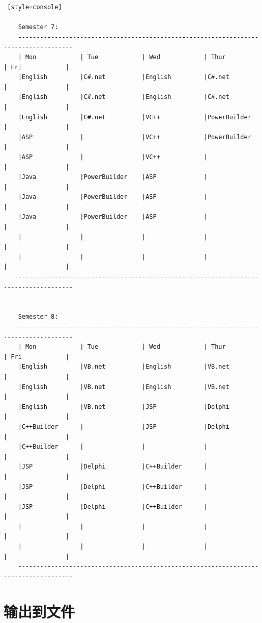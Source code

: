 \begin{lstlisting} [style=console]
    
    Semester 7: 
    -------------------------------------------------------------------------------------
    | Mon            | Tue            | Wed            | Thur           | Fri            |
    |English         |C#.net          |English         |C#.net          |                |
    |English         |C#.net          |English         |C#.net          |                |
    |English         |C#.net          |VC++            |PowerBuilder    |                |
    |ASP             |                |VC++            |PowerBuilder    |                |
    |ASP             |                |VC++            |                |                |
    |Java            |PowerBuilder    |ASP             |                |                |
    |Java            |PowerBuilder    |ASP             |                |                |
    |Java            |PowerBuilder    |ASP             |                |                |
    |                |                |                |                |                |
    |                |                |                |                |                |
    -------------------------------------------------------------------------------------
    
    
    Semester 8: 
    -------------------------------------------------------------------------------------
    | Mon            | Tue            | Wed            | Thur           | Fri            |
    |English         |VB.net          |English         |VB.net          |                |
    |English         |VB.net          |English         |VB.net          |                |
    |English         |VB.net          |JSP             |Delphi          |                |
    |C++Builder      |                |JSP             |Delphi          |                |
    |C++Builder      |                |                |                |                |
    |JSP             |Delphi          |C++Builder      |                |                |
    |JSP             |Delphi          |C++Builder      |                |                |
    |JSP             |Delphi          |C++Builder      |                |                |
    |                |                |                |                |                |
    |                |                |                |                |                |
    -------------------------------------------------------------------------------------
\end{lstlisting}

\section{输出到文件}

